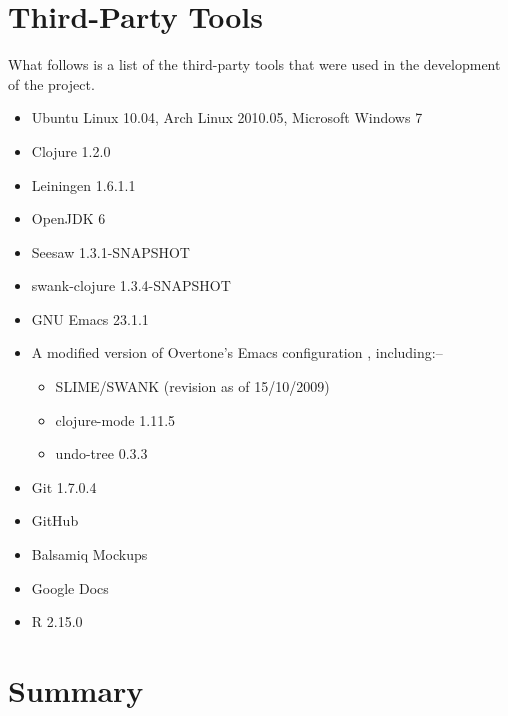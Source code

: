 \documentclass[12pt,twoside,notitlepage,xetex]{report}
\begin{document}



\section{Third-Party Tools}

What follows is a list of the third-party tools that were used in the
development of the project.
\begin{itemize}
\item Ubuntu Linux 10.04, Arch Linux 2010.05, Microsoft Windows 7
\item Clojure 1.2.0
\item Leiningen 1.6.1.1
\item OpenJDK 6
\item Seesaw 1.3.1-SNAPSHOT
\item swank-clojure 1.3.4-SNAPSHOT
\item GNU Emacs 23.1.1
\item A modified version of Overtone's Emacs configuration \cite{OvertoneEmacsD}, including:--
\begin{itemize}
\item SLIME/SWANK (revision as of 15/10/2009)
\item clojure-mode 1.11.5
\item undo-tree 0.3.3
\end{itemize}
\item Git 1.7.0.4
\item GitHub
\item Balsamiq Mockups
\item Google Docs
\item R 2.15.0
\end{itemize}

\section{Summary}
\end{document}
